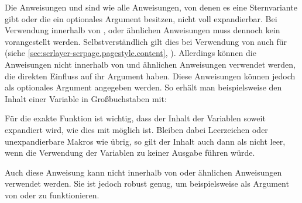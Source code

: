 \begin{Declaration}
\end{Declaration}
Die Anweisungen  und
 sind wie alle Anweisungen, von denen es
eine Sternvariante gibt oder die ein optionales Argument besitzen, nicht voll
expandierbar.  Bei Verwendung innerhalb von
,
 oder ähnlichen
Anweisungen muss dennoch kein  vorangestellt
werden. Selbstverständlich gilt dies bei Verwendung von
\hyperref[cha:scrlayer-scrpage]{}%
 auch für
 (siehe
\autoref{sec:scrlayer-scrpage.pagestyle.content},
).  Allerdings
können die Anweisungen nicht innerhalb von
und ähnlichen Anweisungen verwendet werden, die direkten Einfluss auf ihr
Argument haben. Diese Anweisungen können jedoch als optionales Argument
angegeben werden. So erhält man beispielsweise den Inhalt einer Variable in
Großbuchstaben mit:
\begin{lstcode}[escapeinside=><]
\end{lstcode}
%
\EndIndexGroup


\begin{Declaration}
\end{Declaration}
Für die exakte Funktion ist wichtig, dass der Inhalt der Variablen soweit
expandiert wird, wie dies mit  möglich ist. Bleiben dabei
Leerzeichen oder unexpandierbare Makros wie  übrig, so gilt der
Inhalt auch dann als nicht leer, wenn die Verwendung der Variablen zu keiner
Ausgabe führen würde.

Auch diese Anweisung kann nicht innerhalb von
 oder ähnlichen Anweisungen verwendet werden. Sie ist
jedoch robust genug, um beispielsweise als Argument von
 oder  zu
funktionieren.%
\EndIndexGroup


